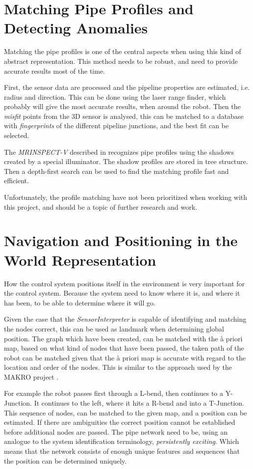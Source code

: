 \section{Matching Pipe Profiles and Detecting Anomalies}
Matching the pipe profiles is one of the central aspects when using this kind of abstract
representation. This method needs to be robust, and need to provide accurate results most
of the time.

First, the sensor data are processed and the pipeline properties are estimated, i.e.
radius and direction. This can be done using the laser range finder, which probably will
give the most accurate results, when around the robot. Then the \emph{misfit} points from
the 3D sensor is analysed, this can be matched to a database with \emph{fingerprints} of
the different pipeline junctions, and the best fit can be selected.

The \emph{MRINSPECT-V} described in \cite{MRINSPECT-V} recognizes pipe profiles using the 
shadows created by a special illuminator. The shadow profiles are stored in tree
structure. Then a depth-first search can be used to find the matching profile fast and
efficient. 


Unfortunately, the profile matching have not been prioritized when working with this
project, and should be a topic of further research and work. 


\section{Navigation and Positioning in the World Representation}
How the control system positions itself in the environment is very important for the
control system. Because the system need to know where it is, and where it has been, to be
able to determine where it will go. 

Given the case that the \emph{SensorInterpreter} is capable of identifying and matching
the nodes correct, this can be used as landmark when determining global position. The
graph which have been created, can be matched with the \`a priori map, based on what kind
of nodes that have been passed, the taken path of the robot can be matched given that the
\`a priori map is accurate with regard to the location and order of the nodes. This is
similar to the approach used by the MAKRO project \cite{makro-visual}.

For example the robot passes first through a L-bend, then continues to a Y-Junction. It
continues to the left, where it hits a R-bend and into a T-Junction. This sequence of
nodes, can be matched to the given map, and a position can be estimated. If there are
ambiguities the correct position cannot be established before additional nodes are passed.
The pipe network need to be, using an analogue to the system identification terminology, 
\emph{persistently exciting}. Which means that the network consists of enough unique features and
sequences that the position can be determined uniquely. 

